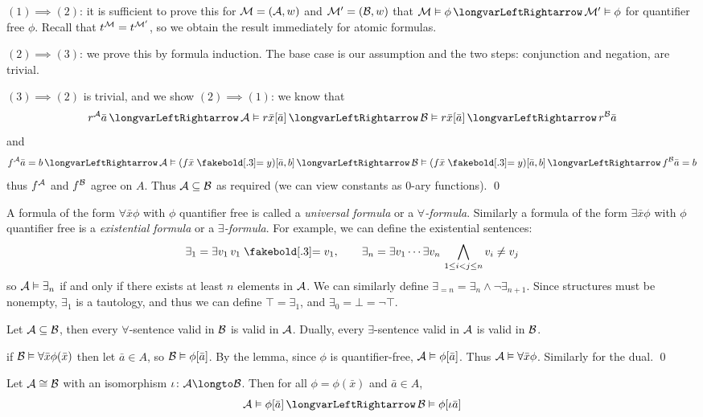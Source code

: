\elemm

\Proof $(1)\implies(2)$: it is sufficient to prove this for ${\cal M}=({\cal A},w)$ and ${\cal M}'=({\cal B},w)$ that $\c M\vDash\phi\iff\c M'\vDash\phi$ for quantifier free $\phi$.
Recall that $t^{{\cal M}}=t^{{\cal M}'}$, so we obtain the result immediately for atomic formulas.

$(2)\implies(3)$: we prove this by formula induction.
The base case is our assumption and the two steps: conjunction and negation, are trivial.

$(3)\implies(2)$ is trivial, and we show $(2)\implies(1)$: we know that
$$ r^{\c A}\bar a\iff \c A\vDash r\bar x[\bar a] \iff \c B\vDash r\bar x[\bar a] \iff r^{\c B}\bar a $$
and
$$ f^{\c A}\bar a=b \iff \c A\vDash(f\bar x\eq y)[\bar a,b] \iff \c B\vDash(f\bar x\eq y)[\bar a,b] \iff f^{\c B}\bar a = b $$
thus $f^{{\cal A}}$ and $f^{{\cal B}}$ agree on $A$.
Thus ${\cal A}\subseteq{\cal B}$ as required (we can view constants as $0$-ary functions).
\qed

A formula of the form $\forall\bar x\phi$ with $\phi$ quantifier free is called a {\it universal formula} or a {\it $\forall$-formula}.
Similarly a formula of the form $\exists\bar x\phi$ with $\phi$ quantifier free is a {\it existential formula} or a {\it $\exists$-formula}.
For example, we can define the existential sentences:
$$ \exists_1 = \exists v_1\,v_1\eq v_1,\qquad \exists_n = \exists v_1\cdots\exists v_n\,\bigwedge_{1\leq i<j\leq n}v_i\neq v_j $$
so ${\cal A}\vDash\exists_n$ if and only if there exists at least $n$ elements in ${\cal A}$.
We can similarly define $\exists_{=n} = \exists_n\land\neg\exists_{n+1}$.
Since structures must be nonempty, $\exists_1$ is a tautology, and thus we can define $\top=\exists_1$, and $\exists_0=\bot=\neg\top$.

\bcoro

    Let ${\cal A}\subseteq{\cal B}$, then every $\forall$-sentence valid in ${\cal B}$ is valid in ${\cal A}$.
    Dually, every $\exists$-sentence valid in ${\cal A}$ is valid in ${\cal B}$.

\ecoro

\Proof if ${\cal B}\vDash\forall\bar x\phi(\bar x)$ then let $\bar a\in A$, so ${\cal B}\vDash\phi[\bar a]$.
By the lemma, since $\phi$ is quantifier-free, ${\cal A}\vDash\phi[\bar a]$.
Thus ${\cal A}\vDash\forall\bar x\phi$.
Similarly for the dual.
\qed

\bthrm[title=The Invariance Theorem]

    Let ${\cal A}\cong{\cal B}$ with an isomorphism $\iota\colon\c A\longto\c B$.
    Then for all $\phi=\phi(\bar x)$ and $\bar a\in A$,
    $$ \c A\vDash\phi[\bar a] \iff \c B\vDash\phi[\iota\bar a] $$

